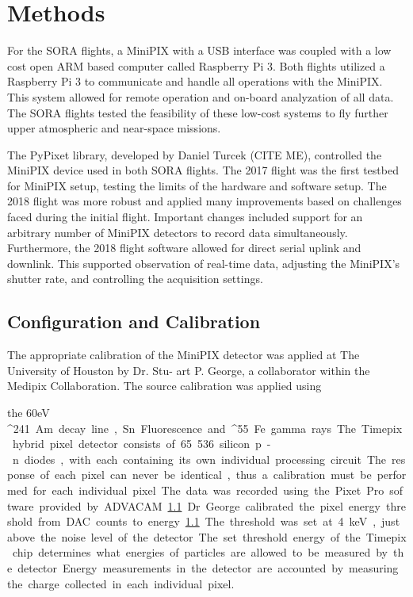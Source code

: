 \section{Methods}
\label{Methods}
For the SORA flights, a MiniPIX with a USB interface was coupled with a low cost open ARM based computer called Raspberry Pi 3.  Both flights utilized a Raspberry Pi 3 to communicate and handle all operations with the MiniPIX.  This system allowed for remote operation and on-board analyzation of all data.  The SORA flights tested the feasibility of these low-cost systems to fly further upper atmospheric and near-space missions.  

The PyPixet library, developed by Daniel Turcek (CITE ME), controlled the MiniPIX device used in both SORA flights.  The 2017 flight was the first testbed for MiniPIX setup, testing the limits of the hardware and software setup.  The 2018 flight was more robust and applied many improvements based on challenges faced during the initial flight.  Important changes included support for an arbitrary number of MiniPIX detectors to record data simultaneously.  Furthermore, the 2018 flight software allowed for direct serial uplink and downlink. This supported observation of real-time data, adjusting the MiniPIX's shutter rate, and controlling the acquisition settings.

\subsection{Configuration and Calibration}
The appropriate calibration of the MiniPIX detector was applied at The University of Houston by Dr. Stu-
art P. George, a collaborator within the Medipix Collaboration. The source calibration was applied using

the \SI{60} {\kilo}eV \SI{^241}Am decay line, Sn Fluorescence and \SI{^55}Fe gamma rays. The Timepix hybrid pixel detector
consists of 65 536 silicon p-n diodes, with each containing its own individual processing circuit. The response
of each pixel can never be identical, thus a calibration must be performed for each individual pixel. 

The data was recorded using the Pixet Pro software provided by ADVACAM ~\ref{}. Dr. George calibrated
the pixel energy threshold from DAC counts to energy ~\ref{}. The threshold was set at 4 keV, just above
the noise level of the detector. The set threshold energy of the Timepix chip determines what energies of
particles are allowed to be measured by the detector. Energy measurements in the detector are accounted
by measuring the charge collected in each individual pixel.

